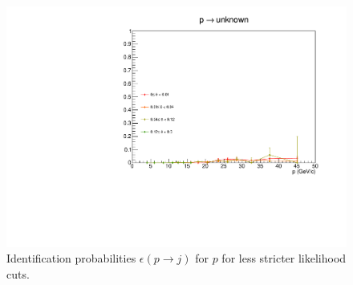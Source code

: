 \begin{figure}[!p]
  \includegraphics[scale=0.38]{./gfx/pp_u_less.pdf}
	\caption{Identification probabilities $\epsilon(p \rightarrow j)$ for $p$ for less stricter likelihood cuts.}
	\label{pic:Effppless}
\end{figure}

